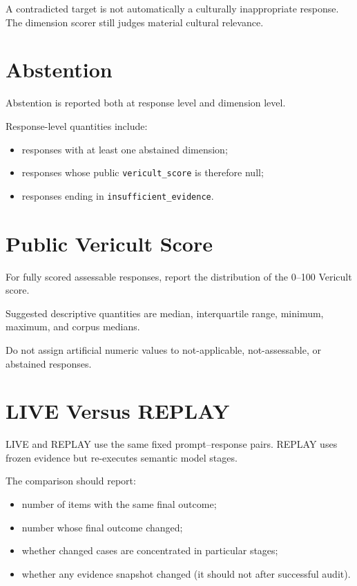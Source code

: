 A contradicted target is not automatically a culturally inappropriate response. The dimension scorer still judges material cultural relevance.

\section{Abstention}

Abstention is reported both at response level and dimension level.

Response-level quantities include:

\begin{itemize}
\item responses with at least one abstained dimension;
\item responses whose public \texttt{vericult\_score} is therefore null;
\item responses ending in \texttt{insufficient\_evidence}.
\end{itemize}


\section{Public Vericult Score}

For fully scored assessable responses, report the distribution of the 0--100 Vericult score.

Suggested descriptive quantities are median, interquartile range, minimum, maximum, and corpus medians.

Do not assign artificial numeric values to not-applicable, not-assessable, or abstained responses.


\section{LIVE Versus REPLAY}

LIVE and REPLAY use the same fixed prompt--response pairs. REPLAY uses frozen evidence but re-executes semantic model stages.

The comparison should report:

\begin{itemize}
\item number of items with the same final outcome;
\item number whose final outcome changed;
\item whether changed cases are concentrated in particular stages;
\item whether any evidence snapshot changed (it should not after successful audit).
\end{itemize}

